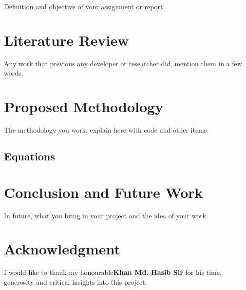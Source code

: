 \documentclass[conference]{IEEEtran}
\begin{document}
Definition and objective of your assignment or report.

\section{Literature Review}

Any work that previous any developer or researcher did, mention them in a few words.


\section{Proposed Methodology}

The methodology you work, explain here with code and other items.


\subsection{Equations}


\section{Conclusion and Future Work}

In future, what you bring in your project and the idea of your work.

\section*{Acknowledgment}

I would like to thank my honourable\textbf{Khan Md. Hasib Sir} for his time, generosity and critical insights into this project.




\vspace{12pt}
\end{document}
